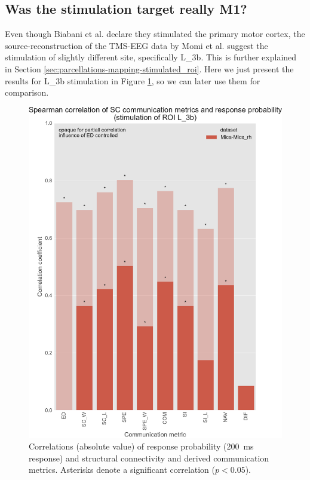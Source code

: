 \subsection{Was the stimulation target really M1?}

Even though Biabani et al. \cite{biabani_characterizing_2019} declare they stimulated the primary motor cortex, the source-reconstruction of the TMS-EEG data by Momi et al. \cite{momi_tms-evoked_2023} suggest the stimulation of slightly different site, specifically L\_3b. This is further explained in Section \ref{sec:parcellations-mapping-stimulated_roi}. Here we just present the results for L\_3b stimulation in Figure \ref{fig:ftract_mica_long_probabilities_L3b}, so we can later use them for comparison.

\begin{figure}
    \centering
    \includegraphics[width=\textwidth]{images/nootebook_generated/ftract_results_per_roi/long/MNI-HCP-MMP1/ED0/0.25/Spearman_correlation_of_SC_communication_metrics_and_response_probability_(stimulation_of_ROI_L_3b).pdf}
    \caption[F-TRACT probability correlations - Mica-Mics\_rh L\_3b]{Correlations (absolute value) of response probability (200~ms response) and structural connectivity and derived communication metrics. Asterisks denote a significant correlation ($p<0.05$).}
    \label{fig:ftract_mica_long_probabilities_L3b}
\end{figure}

